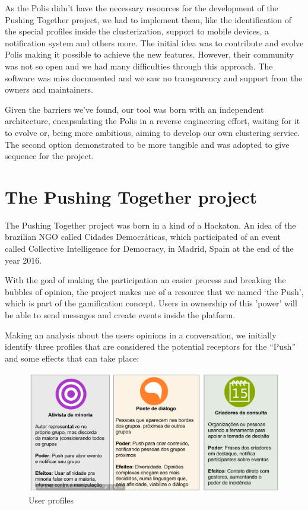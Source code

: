 \documentclass{llncs}
\begin{document}
  As the Polis didn’t have the necessary resources for the development of
  the Pushing Together project, we had to implement them, like the identification of
  the special profiles inside the clusterization, support to mobile devices, a notification
  system and others more. The initial idea was to contribute and evolve Polis making it
  possible to achieve the new features. However, their community was not so
  open and we had many difficulties through this approach. The software was miss
  documented and we saw no transparency and support from the owners and maintainers.

  Given the barriers we’ve found, our tool was born with an independent
  architecture, encapsulating the Polis in a reverse engineering effort, waiting
  for it to evolve or, being more ambitious, aiming to develop our own clustering
  service. The second option demonstrated to be more tangible and was adopted to
  give sequence for the project.

\section{The Pushing Together project}
\label{sec:pushingtogether}

  The Pushing Together project was born in a kind of a Hackaton. An idea of the 
  brazilian NGO called Cidades Democráticas, which participated of an event
  called Collective Intelligence for Democracy, in Madrid, Spain at the end of
  the year 2016.

  With the goal of making the participation an easier process and breaking the
  bubbles of opinion, the project makes use of a resource that we named ‘the Push’,
  which is part of the gamification concept. Users in ownership of this 'power'
  will be able to send messages and create events inside the platform.

  Making an analysis about the users opinions in a conversation, we initially
  identify three profiles that are considered the potential receptors for the “Push”
  and some effects that can take place: 

 \begin{figure}[H]
   \centering
     \includegraphics[keepaspectratio=true,scale=0.25]{images/userprofiles.png}
   \caption{User profiles}
   \label{fig:userprofiles}
 \end{figure}
\end{document}
